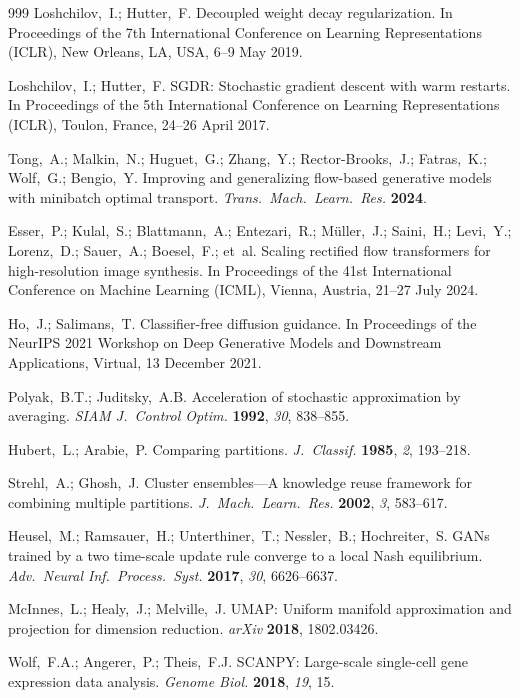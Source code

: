 \documentclass[preprint,12pt]{elsarticle}
\begin{document}
\begin{thebibliography}{999}
Loshchilov,~I.; Hutter,~F. Decoupled weight decay regularization. In Proceedings of the 7th International Conference on Learning Representations (ICLR), New Orleans, LA, USA, 6--9 May 2019.

Loshchilov,~I.; Hutter,~F. SGDR: Stochastic gradient descent with warm restarts. In Proceedings of the 5th International Conference on Learning Representations (ICLR), Toulon, France, 24--26 April 2017.

Tong,~A.; Malkin,~N.; Huguet,~G.; Zhang,~Y.; Rector-Brooks,~J.; Fatras,~K.; Wolf,~G.; Bengio,~Y. Improving and generalizing flow-based generative models with minibatch optimal transport. {\em Trans.\ Mach.\ Learn.\ Res.} {\bf 2024}.

Esser,~P.; Kulal,~S.; Blattmann,~A.; Entezari,~R.; M\"{u}ller,~J.; Saini,~H.; Levi,~Y.; Lorenz,~D.; Sauer,~A.; Boesel,~F.; et~al. Scaling rectified flow transformers for high-resolution image synthesis. In Proceedings of the 41st International Conference on Machine Learning (ICML), Vienna, Austria, 21--27 July 2024.

Ho,~J.; Salimans,~T. Classifier-free diffusion guidance. In Proceedings of the NeurIPS 2021 Workshop on Deep Generative Models and Downstream Applications, Virtual, 13 December 2021.

Polyak,~B.T.; Juditsky,~A.B. Acceleration of stochastic approximation by averaging. {\em SIAM J.\ Control Optim.} {\bf 1992}, {\em 30}, 838--855.

Hubert,~L.; Arabie,~P. Comparing partitions. {\em J.\ Classif.} {\bf 1985}, {\em 2}, 193--218.

Strehl,~A.; Ghosh,~J. Cluster ensembles---A knowledge reuse framework for combining multiple partitions. {\em J.\ Mach.\ Learn.\ Res.} {\bf 2002}, {\em 3}, 583--617.

Heusel,~M.; Ramsauer,~H.; Unterthiner,~T.; Nessler,~B.; Hochreiter,~S. GANs trained by a two time-scale update rule converge to a local Nash equilibrium. {\em Adv.\ Neural Inf.\ Process.\ Syst.} {\bf 2017}, {\em 30}, 6626--6637.

McInnes,~L.; Healy,~J.; Melville,~J. UMAP: Uniform manifold approximation and projection for dimension reduction. {\em arXiv} {\bf 2018}, 1802.03426.

Wolf,~F.A.; Angerer,~P.; Theis,~F.J. SCANPY: Large-scale single-cell gene expression data analysis. {\em Genome Biol.} {\bf 2018}, {\em 19}, 15.


\end{thebibliography}
\end{document}
